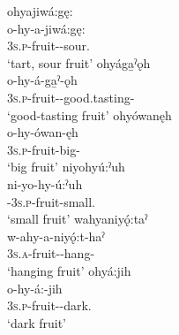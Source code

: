 \ea\label{ex:incverbex5}
\ea ohyajiwá:gę:\\
\gll o-hy-a-jiwá:gę:\\
 \textsc{3s.p}-fruit-{\joinerA}-sour.{\stative}\\
\glt `tart, sour fruit'
\ex ohyága̱ˀǫh\\
\gll o-hy-á-ga̱ˀ-ǫh\\
 \textsc{3s.p}-fruit-{\joinerA}-good.tasting-{\stative}\\
\glt `good-tasting fruit'
\ex ohyówanęh\\
\gll o-hy-ówan-ęh\\
 \textsc{3s.p}-fruit-big-{\stative}\\
\glt `big fruit'
\ex niyohyú:ˀuh\\
\gll ni-yo-hy-ú:ˀuh\\
 {\partitive}-\textsc{3s.p}-fruit-small.{\stative}\\
\glt `small fruit'
\ex wahyaniyǫ́:taˀ\\
\gll w-ahy-a-niyǫ́:t-haˀ\\
 \textsc{3s.a}-fruit-{\joinerA}-hang-{\habitual}\\
\glt `hanging fruit'
\ex ohyá:jih\\
\gll o-hy-á:-jih\\
 \textsc{3s.p}-fruit-{\joinerA}-dark.{\stative}\\
\glt `dark fruit'
